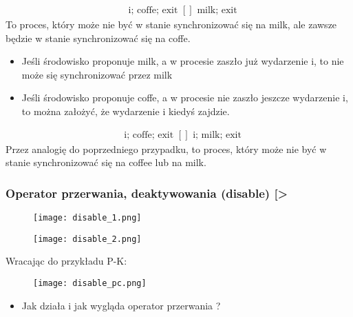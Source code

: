 \documentclass[a4paper,15pt]{article}
\newcommand{\example}[2]{
    \begin{tcolorbox}[colback=blue!5!white,colframe=blue,title={Przykład #1}]
        #2
    \end{tcolorbox}
}
\begin{document}
\example{}{
\begin{align*}
& \text{i; coffe; exit } [] \text{ milk; exit}
\end{align*}
To proces, który może nie być w stanie synchronizować się na milk, ale zawsze będzie w stanie synchronizować się na coffe.
\begin{itemize}
\item Jeśli środowisko proponuje milk, a w procesie zaszło już wydarzenie i, to nie może się synchronizować przez milk
\item Jeśli środowisko proponuje coffe, a w procesie nie zaszło jeszcze wydarzenie i, to można założyć, że wydarzenie i kiedyś zajdzie.
\end{itemize}
}

\example{}{
\begin{align*}
& \text{i; coffe; exit } [] \text{ i; milk; exit}
\end{align*}
Przez analogię do poprzedniego przypadku, to proces, który może nie być w stanie synchronizować się na coffee lub na milk.
}





\newpage
\subsubsection{Operator przerwania, deaktywowania (disable) [>}
\begin{figure}[H]
\centerline{\texttt{[image: disable\_1.png]}}
\label{fig:disable1}
\end{figure}
\begin{figure}[H]
\centerline{\texttt{[image: disable\_2.png]}}
\label{fig:disable2}
\end{figure}

\newpage
Wracając do przykładu P-K:
\begin{figure}[H]
\centerline{\texttt{[image: disable\_pc.png]}}
\label{fig:disable_pc}
\end{figure}

\begin{framed}
\begin{itemize}
\item Jak działa i jak wygląda operator przerwania ? 
\end{itemize}
\end{framed}



\newpage
\end{document}

